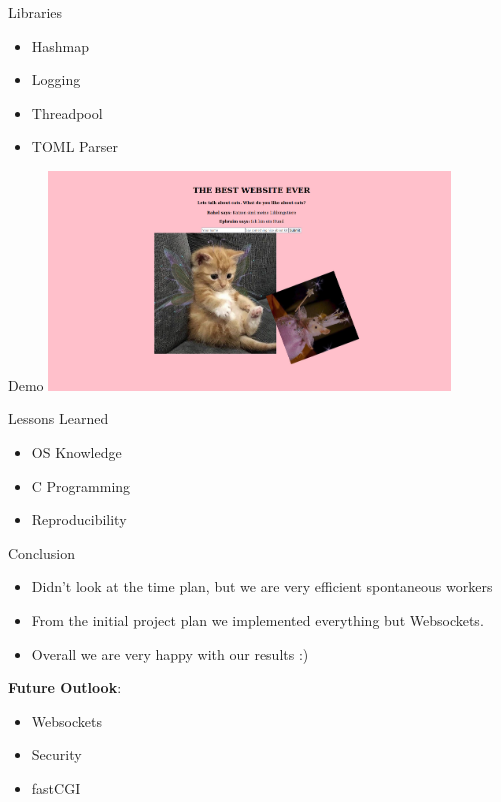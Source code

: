\documentclass[aspectratio=169]{beamer}
\begin{document}
\begin{frame}[c]{Libraries}
    \centering
    \begin{itemize}
        \item Hashmap %
        \item Logging %
        \item Threadpool %
        \item TOML Parser %
    \end{itemize}
\end{frame}

\begin{frame}[c]{Demo}
    \centering
    \includegraphics[width=0.8\textwidth,height=0.8\textheight,keepaspectratio]{demo.png}
\end{frame}

\begin{frame}[c]{Lessons Learned}
    \centering
    \begin{itemize}
        \item OS Knowledge 
        \item C Programming 
        \item Reproducibility
    \end{itemize}
\end{frame}

\begin{frame}[c]{Conclusion}
    \begin{itemize}
        \item Didn't look at the time plan, but we are very efficient spontaneous workers 
        \item From the initial project plan we implemented everything but Websockets. 
        \item Overall we are very happy with our results :)
    \end{itemize}
    \vspace{\baselineskip}
    \textbf{Future Outlook}: \\ 
    \begin{itemize}
        \item Websockets 
        \item Security 
        \item fastCGI 
    \end{itemize}
\end{frame}

\begin{frame}[t,plain]
\end{frame}
\end{document}

